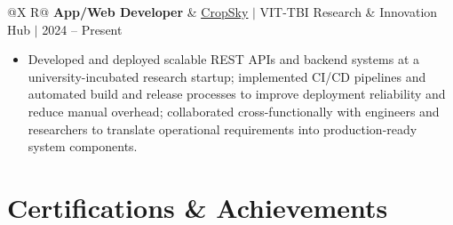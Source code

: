 \documentclass[a4paper,10pt]{article}
\newcommand{\ulink}[2]{\href{#1}{\uline{#2}}}
\newcommand{\subheading}[1]{{\color[HTML]{0A0A0A}\fontsize{12}{14}\selectfont\bfseries #1}}
\newcommand{\meta}[1]{{\color[HTML]{5C5C5C}\fontsize{10.5}{12.5}\selectfont #1}}
\begin{document}
\vspace{4pt}

\begin{tabularx}{\linewidth}{@{}X R@{}}
\subheading{App/Web Developer} & \meta{\ulink{https://sites.google.com/view/cropsky/home}{CropSky} $|$ VIT-TBI Research \& Innovation Hub $|$ 2024 -- Present}
\end{tabularx}
\begin{itemize}[nosep, leftmargin=1.5em, itemsep=1pt, topsep=2pt]
\item {\color[HTML]{0A0A0A}\fontsize{11}{14}\selectfont
Developed and deployed scalable REST APIs and backend systems at a university-incubated research startup; implemented CI/CD pipelines and automated build and release processes to improve deployment reliability and reduce manual overhead; collaborated cross-functionally with engineers and researchers to translate operational requirements into production-ready system components.}
\end{itemize}

\vspace{2pt}

\section{Certifications \& Achievements}
\vspace{2pt}
\end{document}
